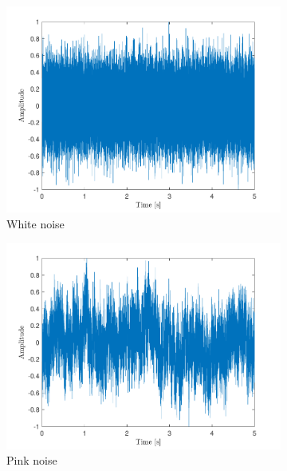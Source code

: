 \documentclass[10pt]{article}
\begin{document}
\begin{figure}[ht]
    \centering
    \begin{subfigure}[b]{0.31\textwidth}
        \includegraphics[width=\textwidth]{problem11_white_noise_time.pdf}
        \caption{White noise}
    \end{subfigure}
    \quad
    \begin{subfigure}[b]{0.31\textwidth}
        \includegraphics[width=\textwidth]{problem11_pink_noise_time.pdf}
        \caption{Pink noise}
    \end{subfigure}
    \quad
    \begin{subfigure}[b]{0.31\textwidth}

\end{subfigure}
\end{figure}
\end{document}
